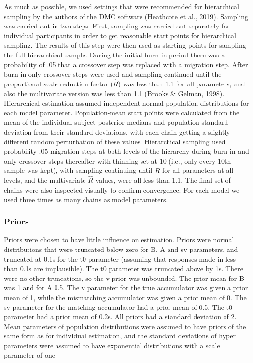 \documentclass[
  man,floatsintext]{apa6}
\begin{document}
As much as possible, we used settings that were recommended for hierarchical sampling by the authors of the DMC software (Heathcote et al., 2019). Sampling was carried out in two steps. First, sampling was carried out separately for individual participants in order to get reasonable start points for hierarchical sampling. The results of this step were then used as starting points for sampling the full hierarchical sample. During the initial burn-in-period there was a probability of .05 that a crossover step was replaced with a migration step. After burn-in only crossover steps were used and sampling continued until the proportional scale reduction factor (\(\hat{R}\)) was less than 1.1 for all parameters, and also the multivariate version was less than 1.1 (Brooks \& Gelman, 1998). Hierarchical estimation assumed independent normal population distributions for each model parameter. Population-mean start points were calculated from the mean of the individual-subject posterior medians and population standard deviation from their standard deviations, with each chain getting a slightly different random perturbation of these values. Hierarchical sampling used probability .05 migration steps at both levels of the hierarchy during burn in and only crossover steps thereafter with thinning set at 10 (i.e., only every 10th sample was kept), with sampling continuing until \(\hat{R}\) for all parameters at all levels, and the multivariate \(\hat{R}\) values, were all less than 1.1. The final set of chains were also inspected visually to confirm convergence. For each model we used three times as many chains as model parameters.

\subsubsection{Priors}\label{priors}

Priors were chosen to have little influence on estimation. Priors were normal distributions that were truncated below zero for B, A and sv parameters, and truncated at 0.1s for the t0 parameter (assuming that responses made in less than 0.1s are implausible). The t0 parameter was truncated above by 1s. There were no other truncations, so the v prior was unbounded. The prior mean for B was 1 and for A 0.5. The v parameter for the true accumulator was given a prior mean of 1, while the mismatching accumulator was given a prior mean of 0. The sv parameter for the matching accumulator had a prior mean of 0.5. The t0 parameter had a prior mean of 0.2s. All priors had a standard deviation of 2. Mean parameters of population distributions were assumed to have priors of the same form as for individual estimation, and the standard deviations of hyper parameters were assumed to have exponential distributions with a scale parameter of one.
\end{document}
